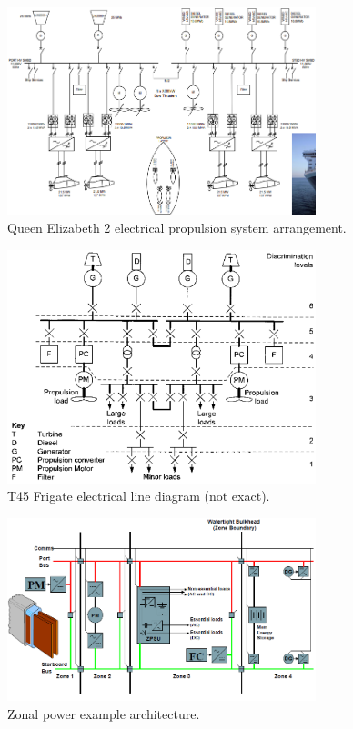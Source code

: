 \begin{figure}[H]
    \centering
    \includegraphics[width = 0.8\textwidth]{img/figure65.png}
    \caption{Queen Elizabeth 2 electrical propulsion system arrangement.}
\end{figure}

\begin{figure}[H]
    \centering
    \includegraphics[width = 0.8\textwidth]{img/figure66.png}
    \caption{T45 Frigate electrical line diagram (not exact).}
\end{figure}

\begin{figure}[H]
    \centering
    \includegraphics[width = 0.8\textwidth]{img/figure67.png}
    \caption{Zonal power example architecture.}
\end{figure}

